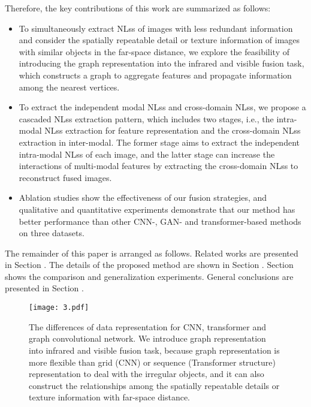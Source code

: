 \documentclass[journal]{IEEEtran}
\begin{document}
Therefore, the key contributions of this work are summarized as follows:
\begin{itemize}
\item To simultaneously extract NLss of images with less redundant information and consider the spatially repeatable detail or texture information of images with similar objects in the far-space distance, we explore the feasibility of introducing the graph representation into the infrared and visible fusion task, which constructs a graph to aggregate features and propagate information among the nearest vertices.

\item To extract the independent modal NLss and cross-domain NLss, we propose a cascaded NLss extraction pattern, which includes two stages, i.e., the intra-modal NLss extraction for feature representation and the cross-domain NLss extraction in inter-modal. The former stage aims to extract the independent intra-modal NLss of each image, and the latter stage can increase the interactions of multi-modal features by extracting the cross-domain NLss to reconstruct fused images.

\item Ablation studies show the effectiveness of our fusion strategies, and qualitative and quantitative experiments demonstrate that our method has better performance than other CNN-, GAN- and transformer-based methods on three datasets.

\end{itemize}

The remainder of this paper is arranged as follows. Related works are presented in Section \uppercase\expandafter{}. The details of the proposed method are shown in Section \uppercase\expandafter{}. Section \uppercase\expandafter{} shows the comparison and generalization experiments. General conclusions are presented in Section \uppercase\expandafter{}.

\begin{figure}[!h]
\centering
\texttt{[image: 3.pdf]}
\caption{The differences of data representation for CNN, transformer and graph convolutional network. We introduce graph representation into infrared and visible fusion task, because graph representation is more flexible than grid (CNN) or sequence (Transformer structure) representation to deal with the irregular objects, and it can also construct the relationships among the spatially repeatable details or texture information with far-space distance.}
\label{FIG:3}
\end{figure}
\end{document}
